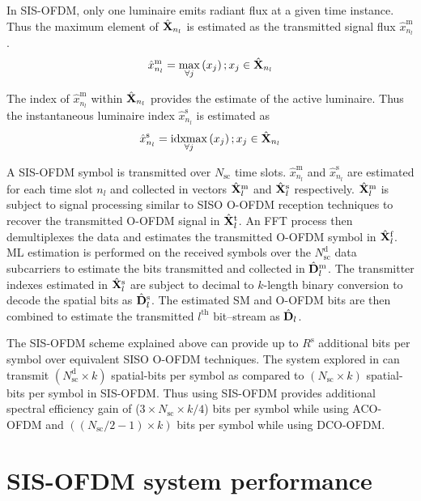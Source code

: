 In SIS-OFDM, only one luminaire emits radiant flux at a given time instance. Thus the maximum element of $\hat{{\bf{X}}}_{n_l}$ is estimated as the transmitted signal flux $\hat{x}^{\text{m}}_{n_l}$.
\begin{equation}
	\label{eqxhsym}
	\hat{x}^{\text{m}}_{n_l} = \max_{\forall j}\left(x_{j}\right); x_{j}\in\hat{{\bf{X}}}_{n_l}
\end{equation}

The index of $\hat{x}^{\text{m}}_{n_l}$ within $\hat{{\bf{X}}}_{n_l}$ provides the estimate of the active luminaire. Thus the instantaneous luminaire index $\hat{x}^{\text{s}}_{n_l}$ is estimated as
\begin{equation}
	\label{eqxhtx}
	\hat{x}^{\text{s}}_{n_l} = \idxmax_{\forall j}\left(x_{j}\right); x_{j}\in\hat{\vm{X}}_{n_l}
\end{equation}

A SIS-OFDM symbol is transmitted over $N_{\text{sc}}$ time slots. $\hat{x}^{\text{m}}_{n_l}$ and $\hat{x}^{\text{s}}_{n_l}$ are estimated for each time slot $n_l$ and collected in vectors $\hat{{\bf{X}}}^{\text{m}}_l$ and $\hat{{\bf{X}}}^{\text{s}}_l$ respectively. $\hat{{\bf{X}}}^{\text{m}}_l$ is subject to signal processing similar to SISO O-OFDM reception techniques to recover the transmitted O-OFDM signal in $\hat{{\bf{X}}}^{\text{t}}_l$. An FFT process then demultiplexes the data and estimates the transmitted O-OFDM symbol in $\hat{{\bf{X}}}^{\text{f}}_l$. ML estimation is performed on the received symbols over the $N_{\text{sc}}^{\text{d}}$ data subcarriers to estimate the bits transmitted and collected in $\hat{{\bf{D}}}^{\text{m}}_l$. The transmitter indexes estimated in $\hat{{\bf{X}}}^{\text{s}}_l$ are subject to decimal to $k$-length binary conversion to decode the spatial bits as $\hat{{\bf{D}}}^{\text{s}}_l$. The estimated SM and O-OFDM bits are then combined to estimate the transmitted $l^{\text{th}}$ bit--stream as $\hat{{\bf{D}}}_l$.

The SIS-OFDM scheme explained above can provide up to $R^{\text{s}}$ additional bits per symbol over equivalent SISO O-OFDM techniques. The system explored in \cite{zha12a} can transmit $(N_{\text{sc}}^{\text{d}}\times k)$ spatial-bits per symbol as compared to $(N_{\text{sc}}\times k)$ spatial-bits per symbol in SIS-OFDM. Thus using SIS-OFDM provides additional spectral efficiency gain of ($3\times N_{\text{sc}}\times k/4$) bits per symbol while using ACO-OFDM and $((N_{\text{sc}}/2 -1)\times k)$ bits per symbol while using DCO-OFDM.

\section{SIS-OFDM system performance}
\label{subsec:sisofdmAnalysis}

